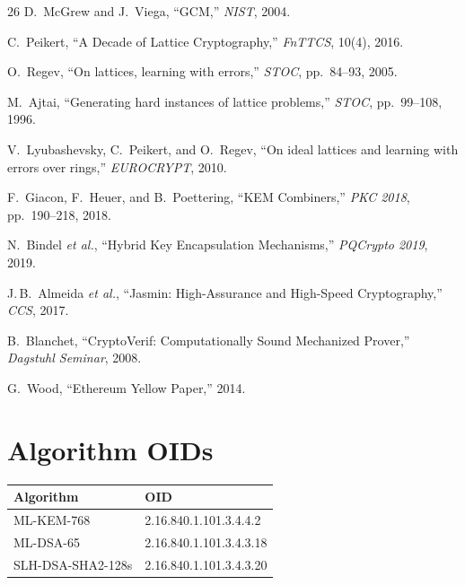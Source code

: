 \documentclass[11pt,a4paper]{article}
\begin{document}
\begin{thebibliography}{26}
D.~McGrew and J.~Viega,
``GCM,''
\emph{NIST}, 2004.

C.~Peikert,
``A Decade of Lattice Cryptography,''
\emph{FnTTCS}, 10(4), 2016.

O.~Regev,
``On lattices, learning with errors,''
\emph{STOC}, pp.~84--93, 2005.

M.~Ajtai,
``Generating hard instances of lattice problems,''
\emph{STOC}, pp.~99--108, 1996.

V.~Lyubashevsky, C.~Peikert, and O.~Regev,
``On ideal lattices and learning with errors over rings,''
\emph{EUROCRYPT}, 2010.

F.~Giacon, F.~Heuer, and B.~Poettering,
``KEM Combiners,''
\emph{PKC 2018}, pp.~190--218, 2018.

N.~Bindel \emph{et al.},
``Hybrid Key Encapsulation Mechanisms,''
\emph{PQCrypto 2019}, 2019.

J.\,B.~Almeida \emph{et al.},
``Jasmin: High-Assurance and High-Speed Cryptography,''
\emph{CCS}, 2017.

B.~Blanchet,
``CryptoVerif: Computationally Sound Mechanized Prover,''
\emph{Dagstuhl Seminar}, 2008.

G.~Wood,
``Ethereum Yellow Paper,''
2014.

\end{thebibliography}

\appendix

\section{Algorithm OIDs}
\label{app:oids}

\begin{table}[h]
\centering
\begin{tabular}{@{}ll@{}}
\toprule
\textbf{Algorithm} & \textbf{OID} \\
\midrule
ML-KEM-768        & 2.16.840.1.101.3.4.4.2 \\
ML-DSA-65         & 2.16.840.1.101.3.4.3.18 \\
SLH-DSA-SHA2-128s & 2.16.840.1.101.3.4.3.20 \\
\bottomrule
\end{tabular}
\end{table}
\end{document}
